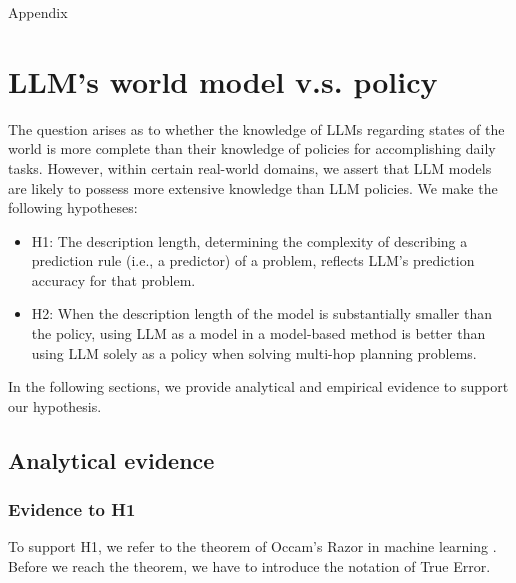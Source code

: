 \newpage
\appendix
{
\bf\LARGE
\begin{center}
    Appendix
\end{center}

}
\iffalse
\section{LLM's world model v.s. policy}

The question arises as to whether the knowledge of LLMs regarding states of the world is more complete than their knowledge of policies for accomplishing daily tasks. However, within certain real-world domains, we assert that LLM models are likely to possess more extensive knowledge than LLM policies. We make the following hypotheses:
\begin{itemize}
    \item H1: The description length, determining the complexity of describing a prediction rule (i.e., a predictor) of a problem, reflects LLM's prediction accuracy for that problem.
    \item H2: When the description length of the model is substantially smaller than the policy, using LLM as a model in a model-based method is better than using LLM solely as a policy when solving multi-hop planning problems. 
\end{itemize}
In the following sections, we provide analytical and empirical evidence to support our hypothesis. 

\subsection{Analytical evidence}

\subsubsection{Evidence to H1}

To support H1, we refer to the theorem of Occam's Razor in machine learning \cite{shalev2014understanding}. Before we reach the theorem, we have to introduce the notation of True Error. 

